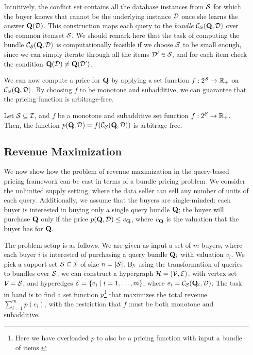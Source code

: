 Intuitively, the conflict set contains all the database instances from $\mathcal{S}$ for which the buyer knows that cannot be the underlying instance $\mathcal{D}$ once she learns the answer $\mathbf{Q}(\mathcal{D})$. This construction maps each query to the {\em  bundle} ${\mathcal{C}}_{\mathcal{S}}(\mathbf{Q},\mathcal{D}) $ over the common itemset $\mathcal{S}$. We should remark here that the task of computing the bundle ${\mathcal{C}}_{\mathcal{S}}(\mathbf{Q},\mathcal{D}) $ is computationally feasible if we choose $\mathcal{S}$ to be small enough, since we can simply iterate through all the items $\mathcal{D}' \in \mathcal{S}$, and for each item check the condition 
$\mathbf{Q}(\mathcal{D}) \neq \mathbf{Q}(\mathcal{D}')$.

We can now compute a price for $\mathbf{Q}$ by applying a set function $f: 2^{\mathcal{S}} \rightarrow  \mathbb{R}_+$ on ${\mathcal{C}}_{\mathcal{S}}(\mathbf{Q}, \mathcal{D})$. 
By choosing $f$ to be monotone and subadditive, we can guarantee that the pricing function is arbitrage-free.

\begin{theorem} \label{cor:arbitrage}
Let $\mathcal{S} \subseteq \mathcal{I}$, and $f$ be a monotone and subadditive set function $f: 2^{\mathcal{S}} \rightarrow  \mathbb{R}_+$. Then, the function $p(\mathbf{Q}, \mathcal{D}) = f({\mathcal{C}}_{\mathcal{S}}(\mathbf{Q}, \mathcal{D}))$ is arbitrage-free.
\end{theorem}

\subsection{Revenue Maximization}

We now show how the problem of revenue maximization in the query-based pricing framework can be cast in terms of a bundle pricing problem. We consider the unlimited supply setting, where the data seller can sell any number of units of each query. 
Additionally, we assume that the buyers are single-minded: each buyer is interested in buying only a single query bundle $\mathbf{Q}$; the buyer will purchase $\mathbf{Q}$ only if the price $p(\mathbf{Q}, \mathcal{D}) \leq v_{\mathbf{Q}}$, where $v_{\mathbf{Q}}$ is the valuation  that the buyer has for $\mathbf{Q}$. 

The problem setup is as follows. We are given as input a set of $m$ buyers, where each buyer $i$ is interested of purchasing a query bundle $\mathbf{Q}_i$ with valuation $v_i$. We pick a support set $\mathcal{S} \subseteq \mathcal{I}$ of size $n = |\mathcal{S}|$. By using the transformation of queries to bundles over $\mathcal{S}$, we can construct a hypergraph $\mathcal{H} = (\mathcal{V},\mathcal{E})$, with vertex set $\mathcal{V} = \mathcal{S}$, and hyperedges $\mathcal{E} = \{{e_i}\mid{i =1, \dots, m}\}$, where $e_i ={\mathcal{C}}_{\mathcal{S}}(\mathbf{Q}_i, \mathcal{D})$.
The task in hand is to find a set function $p$\footnote{Here we have overloaded $p$ to also be a pricing function with input a bundle of items.} that maximizes the total revenue $\sum_{i=1}^m p(e_i)$, with the restriction that $f$ must be both monotone and subadditive. 

